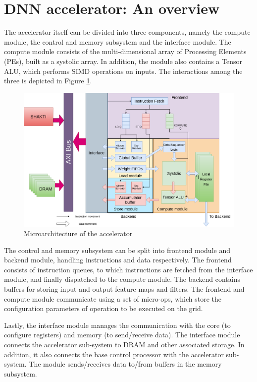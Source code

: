 \section{DNN accelerator: An overview}
The accelerator itself can be divided into three components, namely the compute module, the control and memory subsystem and the interface module. The compute module consists of the multi-dimensional array of Processing Elements (PEs), built as a systolic array. In addition, the module also contains a Tensor ALU, which performs SIMD operations on inputs. The interactions among the three is depicted in Figure \ref{fig:microarch}.

\begin{figure}[h]
    \centering
    \includegraphics[scale=0.35]{images/microarch.png}
    \caption{Microarchitecture of the accelerator}
    \label{fig:microarch}
\end{figure}


\noindent The control and memory subsystem can be split into frontend module and backend module, handling instructions and data respectively. The frontend consists of instruction queues, to which instructions are fetched from the interface module, and finally dispatched to the compute module. The backend contains buffers for storing input and output feature maps and filters. The frontend and compute module communicate using a set of micro-ops, which store the configuration parameters of operation to be executed on the grid. 

\noindent Lastly, the interface module manages the communication with the core (to configure registers) and memory (to send/receive data). The interface module connects the accelerator sub-system to DRAM and other associated storage. In addition, it also connects the base control processor with the accelerator sub-system. The module sends/receives data to/from buffers in the memory subsystem. 


